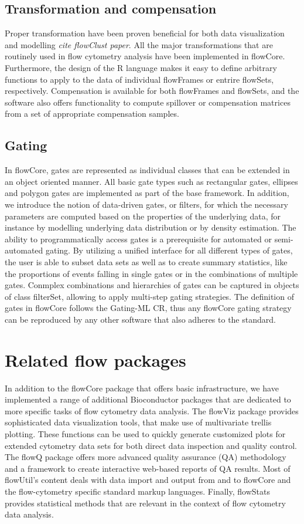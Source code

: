 \documentclass[12pt]{article}
\begin{document}
\subsection*{Transformation and compensation}
Proper transformation have been proven beneficial for both data
visualization and modelling \textit{cite flowClust paper}. All the
major transformations that are routinely used in flow cytometry
analysis have been implemented in flowCore. Furthermore, the design of
the R language makes it easy to define arbitrary functions to apply to
the data of individual flowFrames or entrire flowSets,
respectively. Compensation is available for both flowFrames and
flowSets, and the software also offers functionality to compute
spillover or compensation matrices from a set of appropriate
compensation samples. 



\subsection*{Gating}
In flowCore, gates are represented as individual classes that can be
extended in an object oriented manner. All basic gate types such as
rectangular gates, ellipses and polygon gates are implemented as part
of the base framework. In addition, we introduce the notion of
data-driven gates, or filters, for which the necessary parameters are
computed based on the properties of the underlying data, for instance
by modelling underlying data distribution or by density
estimation. The ability to programmatically access gates is a
prerequisite for automated or semi-automated gating. By utilizing a
unified interface for all different types of gates, the user is able
to subset data sets as well as to create summary statistics, like the
proportions of events falling in single gates or in the combinations
of multiple gates. Conmplex combinations and hierarchies of gates can
be captured in objects of class filterSet, allowing to apply
multi-step gating strategies. The definition of gates in flowCore
follows the Gating-ML CR, thus any flowCore gating strategy can be
reproduced by any other software that also adheres to the standard.

\section*{Related flow packages}
In addition to the flowCore package that offers basic infrastructure,
we have implemented a range of additional Bioconductor packages that
are dedicated to more specific tasks of flow cytometry data
analysis. The flowViz package provides sophisticated data
visualization tools, that make use of multivariate trellis
plotting. These functions can be used to quickly generate customized
plots for extended cytometry data sets for both direct data inspection
and quality control. The flowQ package offers more advanced quality
assurance (QA) methodology and a framework to create interactive
web-based reports of QA results. Most of flowUtil's content deals with
data import and output from and to flowCore and the flow-cytometry
specific standard markup languages. Finally, flowStats provides
statistical methods that are relevant in the context of flow cytometry
data analysis.
\end{document}
